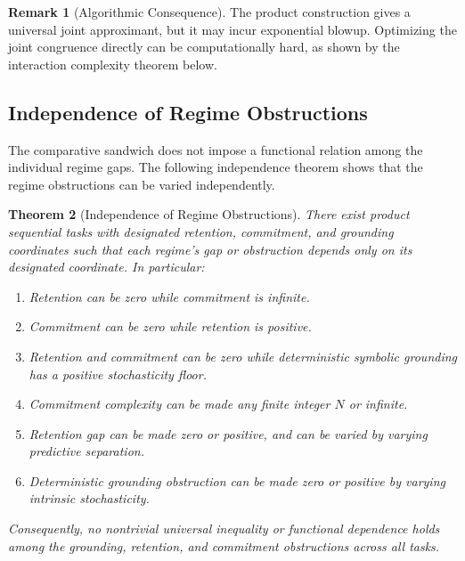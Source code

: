 \documentclass[12pt]{article}
\newtheorem{theorem}{Theorem}[section]
\theoremstyle{definition}
\newtheorem{remark}[theorem]{Remark}
\begin{document}
\begin{remark}[Algorithmic Consequence]
\label{rem:comparative-algorithmic}
The product construction gives a universal joint approximant, but it may incur
exponential blowup.  Optimizing the joint congruence directly can be
computationally hard, as shown by the interaction complexity theorem below.
\end{remark}

\subsection{Independence of Regime Obstructions}
\label{subsec:independence}

The comparative sandwich does not impose a functional relation among the
individual regime gaps.  The following independence theorem shows that the
regime obstructions can be varied independently.

\begin{theorem}[Independence of Regime Obstructions]
\label{thm:independence}
There exist product sequential tasks with designated retention, commitment,
and grounding coordinates such that each regime's gap or obstruction depends
only on its designated coordinate.  In particular:
\begin{enumerate}[label=(\roman*),leftmargin=2.0em]
\item Retention can be zero while commitment is infinite.
\item Commitment can be zero while retention is positive.
\item Retention and commitment can be zero while deterministic symbolic
grounding has a positive stochasticity floor.
\item Commitment complexity can be made any finite integer $N$ or infinite.
\item Retention gap can be made zero or positive, and can be varied by
varying predictive separation.
\item Deterministic grounding obstruction can be made zero or positive by
varying intrinsic stochasticity.
\end{enumerate}
Consequently, no nontrivial universal inequality or functional dependence
holds among the grounding, retention, and commitment obstructions across all
tasks.
\end{theorem}
\end{document}
